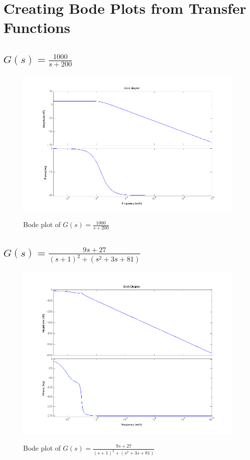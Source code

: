 \documentclass[english]{article}
\begin{document}
\section*{Creating Bode Plots from Transfer Functions}
\subsection{$G(s) = \frac{1000}{s + 200} $}
\begin{figure}[!ht]
\includegraphics[width = \linewidth]{2a.png}
\label{fig:2_a}
\caption{Bode plot of $G(s) = \frac{1000}{s + 200} $}
\end{figure}
\FloatBarrier

\subsection{$G(s) = \frac{9s +27}{(s+1)^2+ (s^2 +3s +81)} $}
\begin{figure}[!ht]
\includegraphics[width = \linewidth]{2b.png}
\label{fig:2_b}
\caption{Bode plot of $G(s) = \frac{9s +27}{(s+1)^2+ (s^2 +3s +81)} $}
\end{figure}
\FloatBarrier
\end{document}

